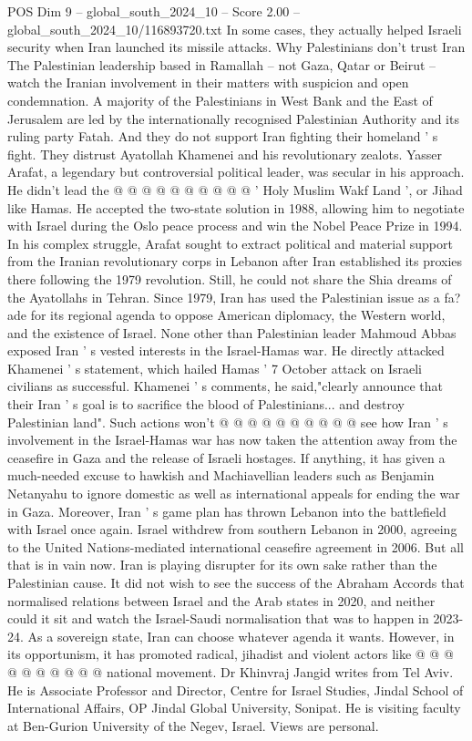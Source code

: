 \begin{textsample}{POS Dim 9 – global\_south\_2024\_10 – Score 2.00 – global\_south\_2024\_10/116893720.txt}
In some cases, they actually helped Israeli security when Iran launched its missile attacks.
Why Palestinians don't trust Iran The Palestinian leadership based in Ramallah -- not Gaza, Qatar or Beirut -- watch the Iranian involvement in their matters with suspicion and open condemnation.
A majority of the Palestinians in West Bank and the East of Jerusalem are led by the internationally recognised Palestinian Authority and its ruling party Fatah.
And they do not support Iran fighting their homeland ' s fight.
They distrust Ayatollah Khamenei and his revolutionary zealots.
Yasser Arafat, a legendary but controversial political leader, was secular in his approach.
He didn't lead the @ @ @ @ @ @ @ @ @ @ ' Holy Muslim Wakf Land ', or Jihad like Hamas.
He accepted the two-state solution in 1988, allowing him to negotiate with Israel during the Oslo peace process and win the Nobel Peace Prize in 1994.
In his complex struggle, Arafat sought to extract political and material support from the Iranian revolutionary corps in Lebanon after Iran established its proxies there following the 1979 revolution.
Still, he could not share the Shia dreams of the Ayatollahs in Tehran.
Since 1979, Iran has used the Palestinian issue as a fa? ade for its regional agenda to oppose American diplomacy, the Western world, and the existence of Israel.
None other than Palestinian leader Mahmoud Abbas exposed Iran ' s vested interests in the Israel-Hamas war.
He directly attacked Khamenei ' s statement, which hailed Hamas ' 7 October attack on Israeli civilians as successful.
Khamenei ' s comments, he said,"clearly announce that their Iran ' s goal is to sacrifice the blood of Palestinians... and destroy Palestinian land".
Such actions won't @ @ @ @ @ @ @ @ @ @ see how Iran ' s involvement in the Israel-Hamas war has now taken the attention away from the ceasefire in Gaza and the release of Israeli hostages.
If anything, it has given a much-needed excuse to hawkish and Machiavellian leaders such as Benjamin Netanyahu to ignore domestic as well as international appeals for ending the war in Gaza.
Moreover, Iran ' s game plan has thrown Lebanon into the battlefield with Israel once again.
Israel withdrew from southern Lebanon in 2000, agreeing to the United Nations-mediated international ceasefire agreement in 2006.
But all that is in vain now.
Iran is playing disrupter for its own sake rather than the Palestinian cause.
It did not wish to see the success of the Abraham Accords that normalised relations between Israel and the Arab states in 2020, and neither could it sit and watch the Israel-Saudi normalisation that was to happen in 2023-24.
As a sovereign state, Iran can choose whatever agenda it wants.
However, in its opportunism, it has promoted radical, jihadist and violent actors like @ @ @ @ @ @ @ @ @ @ national movement.
Dr Khinvraj Jangid writes from Tel Aviv.
He is Associate Professor and Director, Centre for Israel Studies, Jindal School of International Affairs, OP Jindal Global University, Sonipat.
He is visiting faculty at Ben-Gurion University of the Negev, Israel.
Views are personal.

\end{textsample}
